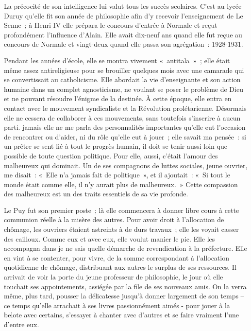 \documentclass[french,twoside]{book} %
\begin{document}
La précocité de son intelligence lui valut tous les succès scolaires. C'est au lycée Duruy qu'elle fit son année de philosophie afin d'y recevoir l'enseignement de Le Senne ; à Henri-IV elle prépara le concours d'entrée à Normale et reçut profondément l'influence d'Alain. Elle avait dix-neuf ans quand elle fut reçue au concours de Normale et vingt-deux quand elle passa son agrégation : 1928-1931.\par
Pendant les années d'école, elle se montra vivement « antitala » ; elle était même assez antireligieuse pour se brouiller quelques mois avec une camarade qui se convertissait au catholicisme. Elle abordait la vie d'enseignante et son action humaine dans un complet agnosticisme, ne voulant se poser le problème de Dieu et ne pouvant résoudre l'énigme de la destinée. À cette époque, elle entra en contact avec le mouvement syndicaliste et la Révolution prolétarienne. Désormais elle ne cessera de collaborer à ces mouvements, sans toutefois s'inscrire à aucun parti. jamais elle ne me parla des personnalités importantes qu'elle eut l'occasion de rencontrer ou d'aider, ni du rôle qu'elle eut à jouer ; elle savait ma pensée : si un prêtre se sent lié à tout le progrès humain, il doit se tenir aussi loin que possible de toute question politique. Pour elle, aussi, c'était l'amour des malheureux qui dominait. Un de ses compagnons de luttes sociales, jeune ouvrier, me disait : « Elle n'a jamais fait de politique », et il ajoutait : « Si tout le monde était comme elle, il n'y aurait plus de malheureux. » Cette compassion des malheureux est un des traits essentiels de sa vie profonde.\par
Le Puy fut son premier poste ; là elle commencera à donner libre cours à cette communion réelle à la misère des autres. Pour avoir droit à l'allocation de chômage, les ouvriers étaient astreints à de durs travaux ; elle les voyait casser des cailloux. Comme eux et avec eux, elle voulut manier le pic. Elle les accompagna dans je ne sais quelle démarche de revendication à la préfecture. Elle en vint à se contenter, pour vivre, de la somme correspondant à l'allocation quotidienne de chômage, distribuant aux autres le surplus de ses ressources. Il arrivait de voir la porte du jeune professeur de philosophie, le jour où elle touchait ses appointements, assiégée par la file de ses nouveaux amis. On la verra même, plus tard, pousser la délicatesse jusqu'à donner largement de son temps -- ce temps qu'elle arrachait à ses livres passionnément aimés - pour jouer à la belote avec certains, s'essayer à chanter avec d'autres et se faire vraiment l'une d'entre eux.\par
\end{document}
